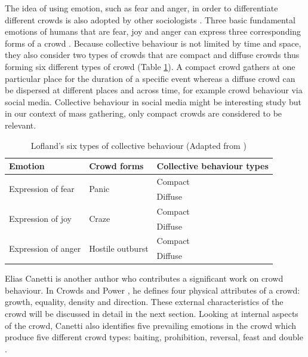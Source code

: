The idea of using emotion, such as fear and anger, in order to differentiate different crowds is also adopted by other sociologists \citep{Lofland1985,Smelser1998}. Three basic fundamental emotions of humans that are fear, joy and anger can express three corresponding forms of a crowd \citep{Imhonopi2013}. Because collective behaviour is not limited by time and space, they also consider two types of crowds that are compact and diffuse crowds thus forming six different types of crowd (Table \ref{table:loflandCollectiveBehaviourType}). A compact crowd gathers at one particular place for the duration of a specific event whereas a diffuse crowd can be dispersed at different places and across time, for example crowd behaviour via social media. Collective behaviour in social media might be interesting study but in our context of mass gathering, only compact crowds are considered to be relevant.

\begin{table}
	\caption{Lofland's six types of collective behaviour (Adapted from \citet{FBI1967})}
	\label{table:loflandCollectiveBehaviourType}
	\centering
	\begin{tabular}{|l|l|l|}
		\hline
		\textbf{Emotion} & \textbf{Crowd forms} & \textbf{Collective behaviour types} \\
		\hline
		\multirow{2}{*}{Expression of fear} & \multirow{2}{*}{Panic} & Compact \\
		& & Diffuse \\
		\hline
		\multirow{2}{*}{Expression of joy} & \multirow{2}{*}{Craze} & Compact \\
		& & Diffuse \\
		\hline
		\multirow{2}{*}{Expression of anger} & \multirow{2}{*}{Hostile outburst} & Compact \\
		& & Diffuse \\		
		\hline
	\end{tabular}
\end{table}

Elias Canetti is another author who contributes a significant work on crowd behaviour. In Crowds and Power \citep{Canetti1962}, he defines four physical attributes of a crowd: growth, equality, density and direction. These external characteristics of the crowd will be discussed in detail in the next section. Looking at internal aspects of the crowd, Canetti also identifies five prevailing emotions in the crowd which produce five different crowd types: baiting, prohibition, reversal, feast and double \citep{McClelland2010}.

